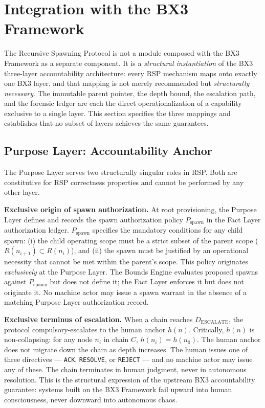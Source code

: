 \section{Integration with the BX3 Framework}
\label{sec:rs-integration}

The Recursive Spawning Protocol is not a module composed with the BX3 Framework as a separate component. It is a \textit{structural instantiation} of the BX3 three-layer accountability architecture: every RSP mechanism maps onto exactly one BX3 layer, and that mapping is not merely recommended but \textit{structurally necessary}. The immutable parent pointer, the depth bound, the escalation path, and the forensic ledger are each the direct operationalization of a capability exclusive to a single layer. This section specifies the three mappings and establishes that no subset of layers achieves the same guarantees.

\subsection{Purpose Layer: Accountability Anchor}
\label{sec:rs-purpose-anchor}

The Purpose Layer serves two structurally singular roles in RSP. Both are constitutive for RSP correctness properties and cannot be performed by any other layer.

\medskip
\noindent\textbf{Exclusive origin of spawn authorization.} At root provisioning, the Purpose Layer defines and records the spawn authorization policy $P_{\mathrm{spawn}}$ in the Fact Layer authorization ledger. $P_{\mathrm{spawn}}$ specifies the mandatory conditions for any child spawn: (i) the child operating scope must be a strict subset of the parent scope ($R(n_{i+1}) \subset R(n_i)$), and (ii) the spawn must be justified by an operational necessity that cannot be met within the parent's scope. This policy originates \textit{exclusively} at the Purpose Layer. The Bounds Engine evaluates proposed spawns against $P_{\mathrm{spawn}}$ but does not define it; the Fact Layer enforces it but does not originate it. No machine actor may issue a spawn warrant in the absence of a matching Purpose Layer authorization record.

\medskip
\noindent\textbf{Exclusive terminus of escalation.} When a chain reaches $D_{\mathrm{ESCALATE}}$, the protocol compulsory-escalates to the human anchor $h(n)$. Critically, $h(n)$ is non-collapsing: for any node $n_i$ in chain $C$, $h(n_i) = h(n_0)$. The human anchor does not migrate down the chain as depth increases. The human issues one of three directives — \texttt{ACK}, \texttt{RESOLVE}, or \texttt{REJECT} — and no machine actor may issue any of these. The chain terminates in human judgment, never in autonomous resolution. This is the structural expression of the upstream BX3 accountability guarantee: systems built on the BX3 Framework fail upward into human consciousness, never downward into autonomous chaos.

